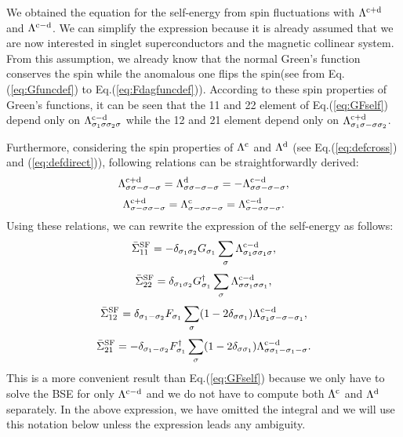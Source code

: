 We obtained the equation for the self-energy from spin fluctuations with $\Lambda^{\rm c + \rm d}$ and $\Lambda^{\rm c - \rm d}$.
We can simplify the expression because it is already assumed that we are now interested in singlet superconductors and the magnetic collinear system.
From this assumption, we already know that the normal Green's function 
conserves the spin while the anomalous one flips the spin(see from Eq.
(\ref{eq:Gfuncdef}) to Eq.(\ref{eq:Fdagfuncdef})).
According to these spin properties of Green's functions, it can be seen that
the 11 and 22 element of Eq.(\ref{eq:GFself}) depend only on $\Lambda^{\rm c - \rm d}_{\sigma_1\sigma\sigma_2\sigma}$ 
while the 12 and 21 element depend only on $\Lambda^{\rm c + \rm d}_{\sigma_1\sigma-\sigma\sigma_2}$.

Furthermore, considering the spin properties of $\Lambda^{\rm c}$ and 
$\Lambda^{\rm d}$ (see Eq.(\ref{eq:defcross}) and (\ref{eq:defdirect})),
following relations can be straightforwardly derived:
%
\begin{equation}
	\Lambda^{\rm c + \rm d}_{\sigma\sigma-\sigma-\sigma} =
	\Lambda^{\rm d}_{\sigma\sigma-\sigma-\sigma} =
	- \Lambda^{\rm c - \rm d}_{\sigma\sigma-\sigma-\sigma},
	\label{eq:lambdasimp1}
\end{equation}
%
\begin{equation}
	\Lambda^{\rm c + \rm d}_{\sigma-\sigma\sigma-\sigma} =
	\Lambda^{\rm c}_{\sigma-\sigma\sigma-\sigma} =
	\Lambda^{\rm c - \rm d}_{\sigma-\sigma\sigma-\sigma}.
	\label{eq:lambdasimp2}
\end{equation}
%
Using these relations, we can rewrite the expression of the self-energy as follows:
%
\begin{equation}
	\bar{\Sigma}^{\rm{SF}}_{11} = -\delta_{\sigma_1\sigma_2}G_{\sigma_1}
	\sum_{\sigma}\Lambda^{\rm c - \rm d}_{\sigma_1\sigma\sigma_1\sigma},
	\label{eq:Sigma11}
\end{equation}
%
\begin{equation}
	\bar{\Sigma}^{\rm{SF}}_{22} = \delta_{\sigma_1\sigma_2}G^{\dag}_{\sigma_1}
	\sum_{\sigma}\Lambda^{\rm c - \rm d}_{\sigma\sigma_1\sigma\sigma_1},
	\label{eq:Sigma22}
\end{equation}
%
\begin{equation}
	\bar{\Sigma}^{\rm{SF}}_{12} = \delta_{\sigma_1-\sigma_2}F_{\sigma_1}
	\sum_{\sigma}(1-2\delta_{\sigma\sigma_1})\Lambda^{\rm c - \rm d}_{\sigma_1\sigma-\sigma-\sigma_1},
	\label{eq:Sigma12}
\end{equation}
%
\begin{equation}
	\bar{\Sigma}^{\rm{SF}}_{21} = -\delta_{\sigma_1-\sigma_2}F^{\dag}_{\sigma_1}
	\sum_{\sigma}(1-2\delta_{\sigma\sigma_1})\Lambda^{\rm c - \rm d}_{\sigma\sigma_1-\sigma_1-\sigma}.
	\label{eq:Sigma21}
\end{equation}
%
This is a more convenient result than Eq.({\ref{eq:GFself}}) because 
we only have to solve the BSE for only $\Lambda^{\rm c - \rm d}$ and 
we do not have to compute both $\Lambda^{\rm c}$ and $\Lambda^{\rm d}$ separately.
In the above expression, we have omitted the integral and we will use this 
notation below unless the expression leads any ambiguity. 


